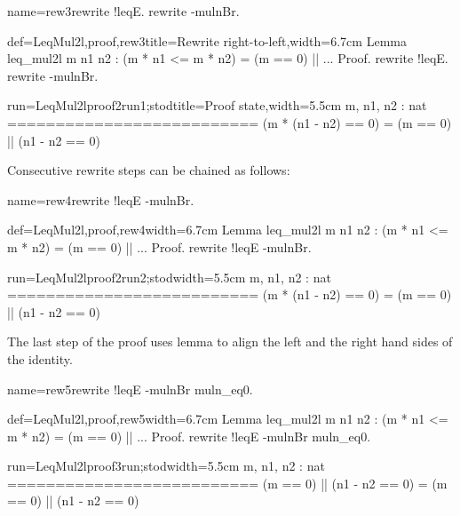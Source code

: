 \begin{coqdef}{name=rew3}rewrite !leqE. rewrite -mulnBr.\end{coqdef}
\begin{coq-left}{def=LeqMul2l,proof,rew3}{title=Rewrite right-to-left,width=6.7cm}
Lemma leq_mul2l m n1 n2 :
 (m * n1 <= m * n2) = (m == 0) || ...
Proof.
rewrite !leqE. rewrite -mulnBr.
\end{coq-left}
\begin{coqout-right}{run=LeqMul2lproof2run1;stod}{title=Proof state,width=5.5cm}
m, n1, n2 : nat
==========================
(m * (n1 - n2) == 0) =
  (m == 0) || (n1 - n2 == 0)
\end{coqout-right}
Consecutive rewrite steps can be chained as follows:

\begin{coqdef}{name=rew4}rewrite !leqE -mulnBr.\end{coqdef}
\begin{coq-left}{def=LeqMul2l,proof,rew4}{width=6.7cm}
Lemma leq_mul2l m n1 n2 :
 (m * n1 <= m * n2) = (m == 0) || ...
Proof.
rewrite !leqE -mulnBr.
\end{coq-left}
\begin{coqout-right}{run=LeqMul2lproof2run2;stod}{width=5.5cm}
m, n1, n2 : nat
==========================
(m * (n1 - n2) == 0) =
  (m == 0) || (n1 - n2 == 0)
\end{coqout-right}
The last step of the proof uses lemma  to align the left
and the right hand sides of the identity.


\begin{coqdef}{name=rew5}rewrite !leqE -mulnBr muln_eq0.\end{coqdef}
\begin{coq-left}{def=LeqMul2l,proof,rew5}{width=6.7cm}
Lemma leq_mul2l m n1 n2 :
 (m * n1 <= m * n2) = (m == 0) || ...
Proof.
rewrite !leqE -mulnBr muln_eq0.
\end{coq-left}
\begin{coqout-right}{run=LeqMul2lproof3run;stod}{width=5.5cm}
m, n1, n2 : nat
==========================
(m == 0) || (n1 - n2 == 0) =
  (m == 0) || (n1 - n2 == 0)
\end{coqout-right}

